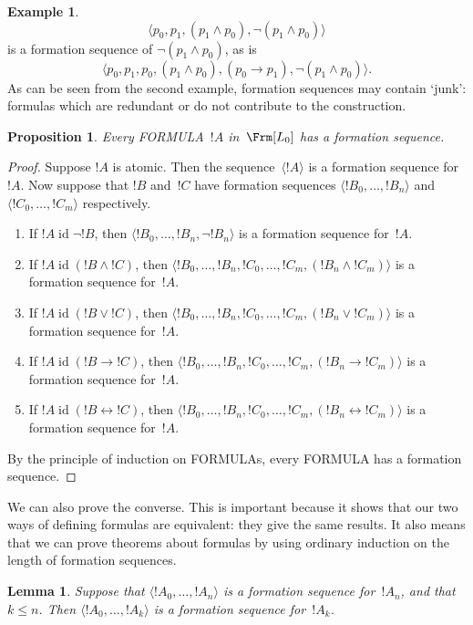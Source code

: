 \documentclass[10pt,a4paper]{article}
\newcommand*{\olup}[1]{\MakeUppercase{#1}}
\theoremstyle{plain}
\newtheorem{lem}[thm]{Lemma}
\newtheorem{prop}[thm]{Proposition}
\theoremstyle{definition}
\newtheorem{ex}[thm]{Example}
\theoremstyle{remark}
\newcommand*{\ollabel}[1]{\label{#1}}
\providecommand{\lif}{\mathbin{\rightarrow}}
\providecommand{\Obj}{}
\providecommand{\tuple}[1]{\langle #1 \rangle}
\providecommand{\tagitem}[1]{\item[#1]}
\providecommand{\liff}{\mathbin{\leftrightarrow}}
\providecommand{\ident}{\operatorname{id}}
\begin{document}
\begin{ex}
\[
\tuple{
    \Obj p_0,
    \Obj p_1,
    (\Obj p_1 \land \Obj p_0),
    \lnot (\Obj p_1 \land \Obj p_0)
}
\]
is a formation sequence of
$\lnot (\Obj p_1 \land \Obj p_0)$, as is
\[
\tuple{
    \Obj p_0,
    \Obj p_1,
    \Obj p_0,
    (\Obj p_1 \land \Obj p_0),
    (\Obj p_0 \lif \Obj p_1),
    \lnot (\Obj p_1 \land \Obj p_0)
}.
\]
%
As can be seen from the second example, formation sequences
may contain `junk': formulas which are redundant or do not
contribute to the construction.
\end{ex}

\begin{prop}
\ollabel{prop:formed}
Every \olup{formula}~$!A$ in~$\Frm[L_0]$ has a formation sequence.
\end{prop}

\begin{proof}
Suppose $!A$ is atomic. Then the sequence~$\tuple{!A}$ is a
formation sequence for~$!A$.
%
Now suppose that $!B$ and~$!C$ have formation sequences
$\tuple{!B_0,\dotsc,!B_n}$ and $\tuple{!C_0,\dotsc,!C_m}$
respectively.
%
\begin{enumerate}
  \tagitem{prvNot}{If $!A \ident \lnot !B$,
      then $\tuple{!B_0,\dotsc,!B_n,\lnot !B_n}$
      is a formation sequence for~$!A$.}{}
  \tagitem{prvAnd}{If $!A \ident (!B \land !C)$,
      then $\tuple{!B_0,\dotsc,!B_n,!C_0,\dotsc,!C_m,(!B_n \land !C_m)}$
      is a formation sequence for~$!A$.}{}
  \tagitem{prvOr}{If $!A \ident (!B \lor !C)$,
      then $\tuple{!B_0,\dotsc,!B_n,!C_0,\dotsc,!C_m,(!B_n \lor !C_m)}$
      is a formation sequence for~$!A$.}{}
  \tagitem{prvIf}{If $!A \ident (!B \lif !C)$,
      then $\tuple{!B_0,\dotsc,!B_n,!C_0,\dotsc,!C_m,(!B_n \lif !C_m)}$
      is a formation sequence for~$!A$.}{}
  \tagitem{prvIff}{If $!A \ident (!B \liff !C)$,
      then $\tuple{!B_0,\dotsc,!B_n,!C_0,\dotsc,!C_m,(!B_n \liff !C_m)}$
      is a formation sequence for~$!A$.}{}
\end{enumerate}
By the principle of induction on \olup{formula}s,
every \olup{formula} has a formation sequence.
\end{proof}

We can also prove the converse. This is important because it shows
that our two ways of defining formulas are equivalent: they give
the same results. It also means that we can prove theorems about
formulas by using ordinary induction on the length of formation
sequences.

\begin{lem}
\ollabel{lem:fseq-init}
Suppose that $\tuple{!A_0,\dotsc,!A_n}$ is a formation sequence
for~$!A_n$, and that $k \leq n$. Then $\tuple{!A_0,\dotsc,!A_k}$
is a formation sequence for~$!A_k$.
\end{lem}
\end{document}
